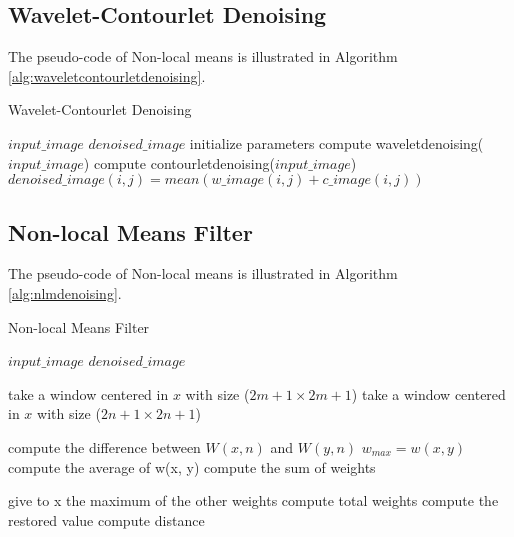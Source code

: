 \subsection{Wavelet-Contourlet Denoising}

The pseudo-code of Non-local means is illustrated in Algorithm \ref{alg:waveletcontourletdenoising}.

\begin{algorithm}
	\caption{Wavelet-Contourlet Denoising}\label{alg:waveletcontourletdenoising}
	\begin{algorithmic}[1]
		\Require $input\_image$
		\Ensure $denoised\_image$
		\State initialize parameters
		\State compute waveletdenoising($input\_image$) 
		\State compute contourletdenoising($input\_image$) 
		\State $denoised\_image(i,j) =  mean(w\_image(i,j)+c\_image(i,j))$
		\EndFor
		\EndProcedure
	\end{algorithmic}
\end{algorithm}


\subsection{Non-local Means Filter}

The pseudo-code of Non-local means is illustrated in Algorithm \ref{alg:nlmdenoising}.

\begin{algorithm}
	\caption{Non-local Means Filter}\label{alg:nlmdenoising}
	\begin{algorithmic}[1]
		\Require $input\_image$
		\Ensure $denoised\_image$
		
			\State take a window centered in $x$ with size ($2m+1 \times 2m+1$)
			\State take a window centered in $x$ with size ($2n+1 \times 2n+1$)

		
				\State compute the difference between $W(x,n)$ and $W( y,n)$
					\State $w_{max} = w(x, y)$
				\EndIf
				\State compute the average of w(x, y)
				\State compute the sum of weights
			\EndFor
		
			\State give to x the maximum of the other weights
			\State compute total weights
			\State compute the restored value
			\State compute distance
		\EndFor
				
		\EndProcedure
	\end{algorithmic}
\end{algorithm}

